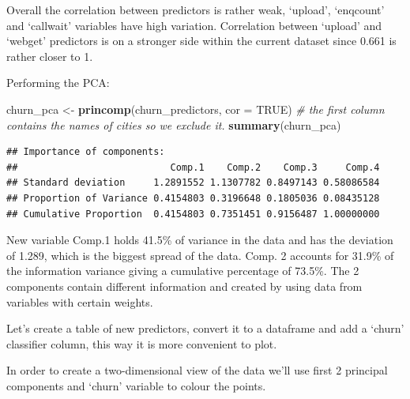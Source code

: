 \documentclass[
]{article}
\newenvironment{Shaded}{\begin{snugshade}}{\end{snugshade}}
\newcommand{\CommentTok}[1]{\textcolor[rgb]{0.56,0.35,0.01}{\textit{#1}}}
\newcommand{\DataTypeTok}[1]{\textcolor[rgb]{0.13,0.29,0.53}{#1}}
\newcommand{\KeywordTok}[1]{\textcolor[rgb]{0.13,0.29,0.53}{\textbf{#1}}}
\newcommand{\NormalTok}[1]{#1}
\newcommand{\OperatorTok}[1]{\textcolor[rgb]{0.81,0.36,0.00}{\textbf{#1}}}
\newcommand{\OtherTok}[1]{\textcolor[rgb]{0.56,0.35,0.01}{#1}}
\newcommand{\StringTok}[1]{\textcolor[rgb]{0.31,0.60,0.02}{#1}}
\begin{document}
Overall the correlation between predictors is rather weak, `upload',
`enqcount' and `callwait' variables have high variation. Correlation
between `upload' and `webget' predictors is on a stronger side within
the current dataset since 0.661 is rather closer to 1.

Performing the PCA:

\begin{Shaded}
\begin{Highlighting}[]
\NormalTok{churn_pca <-}\StringTok{ }\KeywordTok{princomp}\NormalTok{(churn_predictors, }\DataTypeTok{cor =} \OtherTok{TRUE}\NormalTok{)}
\CommentTok{# the first column contains the names of cities so we exclude it.}
\KeywordTok{summary}\NormalTok{(churn_pca)}
\end{Highlighting}
\end{Shaded}

\begin{verbatim}
## Importance of components:
##                           Comp.1    Comp.2    Comp.3     Comp.4
## Standard deviation     1.2891552 1.1307782 0.8497143 0.58086584
## Proportion of Variance 0.4154803 0.3196648 0.1805036 0.08435128
## Cumulative Proportion  0.4154803 0.7351451 0.9156487 1.00000000
\end{verbatim}

New variable Comp.1 holds 41.5\% of variance in the data and has the
deviation of 1.289, which is the biggest spread of the data. Comp. 2
accounts for 31.9\% of the information variance giving a cumulative
percentage of 73.5\%. The 2 components contain different information and
created by using data from variables with certain weights.

Let's create a table of new predictors, convert it to a dataframe and
add a `churn' classifier column, this way it is more convenient to plot.

\begin{Shaded}
\end{Shaded}

In order to create a two-dimensional view of the data we'll use first 2
principal components and `churn' variable to colour the points.
\end{document}
